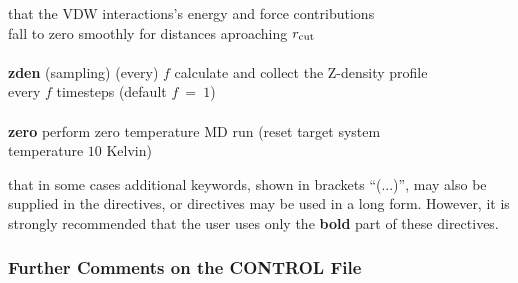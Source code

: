 \begin{tabbing}
\>                                              \> that the VDW interactions's energy and force contributions \\
\>                                              \> fall to zero smoothly for distances aproaching $r_{\rm cut}$ \\
\>                                              \> \\
\> {\bf zden} (sampling) (every) $f$            \> calculate and collect the Z-density profile \\
\>                                              \> every $f$ timesteps (default $f~=~1$) \\
\>                                              \> \\
\> {\bf zero}                                   \> perform zero temperature MD run (reset target system \\
\>                                              \> temperature $10$ Kelvin)
\end{tabbing}

 that in some cases additional keywords, shown in
brackets ``(...)'', may also be supplied in the directives, or
directives may be used in a long form.  However, it is strongly
recommended that the user uses only the {\bf bold} part of these
directives.

\begin{table}[htbp]
\end{table}

\subsubsection{Further Comments on the CONTROL File}

